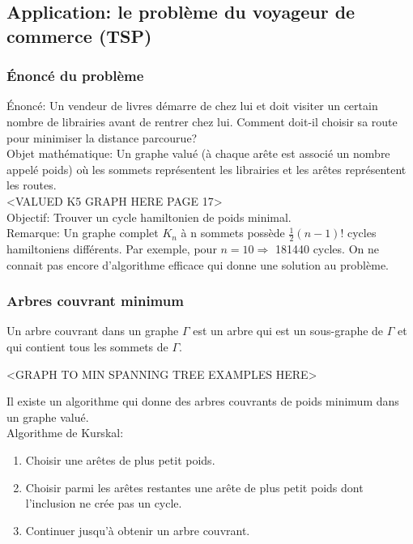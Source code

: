 \subsection{Application: le problème du voyageur de commerce (TSP)}

\subsubsection{Énoncé du problème}

Énoncé: Un vendeur de livres démarre de chez lui et doit visiter un certain nombre de librairies avant de rentrer chez lui. Comment doit-il choisir sa route pour minimiser la distance parcourue? \\ 

Objet mathématique: Un graphe valué (à chaque arête est associé un nombre appelé poids) où les sommets représentent les librairies et les arêtes représentent les routes.\\

<VALUED K5 GRAPH HERE PAGE 17>\\

Objectif: Trouver un cycle hamiltonien de poids minimal.\\

Remarque: Un graphe complet $K_{n}$ à n sommets possède $\frac{1}{2}(n-1)!$ cycles hamiltoniens différents. Par exemple, pour $n=10 \Rightarrow$ 181440 cycles. On ne connait pas encore d'algorithme efficace qui donne une solution au problème.\\

\subsubsection{Arbres couvrant minimum}

\begin{defn}
Un arbre couvrant dans un graphe $\Gamma$ est un arbre qui est un sous-graphe de $\Gamma$ et qui contient tous les sommets de $\Gamma$.\\
\end{defn}

\begin{exmp}
<GRAPH TO MIN SPANNING TREE EXAMPLES HERE>\\
\end{exmp}

Il existe un algorithme qui donne des arbres couvrants de poids minimum dans un graphe valué.\\

Algorithme de Kurskal:
\begin{enumerate}[i]
	\item Choisir une arêtes de plus petit poids.
	\item Choisir parmi les arêtes restantes une arête de plus petit poids dont l'inclusion ne crée pas un cycle.
	\item Continuer jusqu'à obtenir un arbre couvrant.\\
\end{enumerate}

